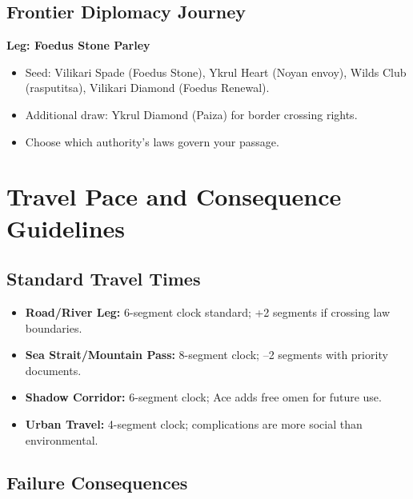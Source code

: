 \subsection{Frontier Diplomacy Journey}
\label{subsec:frontier-diplomacy}

\textbf{Leg: Foedus Stone Parley}
\begin{itemize}
\item Seed: Vilikari Spade (Foedus Stone), Ykrul Heart (Noyan envoy), Wilds Club (rasputitsa), Vilikari Diamond (Foedus Renewal).
\item Additional draw: Ykrul Diamond (Paiza) for border crossing rights.
\item Choose which authority's laws govern your passage.
\end{itemize}

\section{Travel Pace and Consequence Guidelines}
\label{sec:pace-consequences}

\subsection{Standard Travel Times}
\label{subsec:travel-times}

\begin{itemize}
\item \textbf{Road/River Leg:} 6-segment clock standard; +2 segments if crossing law boundaries.
\item \textbf{Sea Strait/Mountain Pass:} 8-segment clock; –2 segments with priority documents.
\item \textbf{Shadow Corridor:} 6-segment clock; Ace adds free omen for future use.
\item \textbf{Urban Travel:} 4-segment clock; complications are more social than environmental.
\end{itemize}

\subsection{Failure Consequences}
\label{subsec:failure-consequences}


